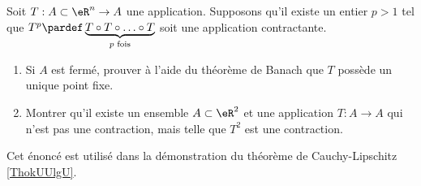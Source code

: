 
\begin{exercice}\label{exoTP20090002}

Soit $T : A \subset {\eR}^n \to A$ une application. Supposons qu'il existe un entier $p > 1$ tel que $T^p \pardef \underbrace{T \circ T \circ \ldots \circ T}_{\text{$p$ fois}}$ soit une application contractante.

\begin{enumerate}
\item
Si $A$ est fermé, prouver à l'aide du théorème de Banach que $T$ possède un unique point fixe.
\item
Montrer qu'il existe un ensemble $A\subset \eR^2$ et une application $T : A \to A$ qui n'est pas une contraction, mais telle que $T^2$ est une contraction.
\end{enumerate}

\begin{remark}
    Cet énoncé est utilisé dans la démonstration du théorème de Cauchy-Lipschitz \ref{ThokUUlgU}.
\end{remark}

\end{exercice}
